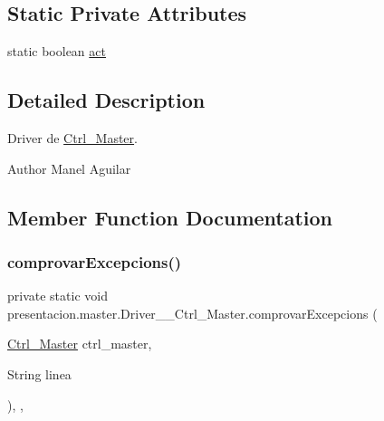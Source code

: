 \subsection*{Static Private Attributes}
\begin{DoxyCompactItemize}
\item 
static boolean \hyperlink{classpresentacion_1_1master_1_1Driver____Ctrl__Master_a76b217371c1036ed3e4e46d2c8d427c4}{act}
\end{DoxyCompactItemize}


\subsection{Detailed Description}
Driver de \hyperlink{classpresentacion_1_1master_1_1Ctrl__Master}{Ctrl\+\_\+\+Master}. 

\begin{DoxyAuthor}{Author}
Manel Aguilar 
\end{DoxyAuthor}


\subsection{Member Function Documentation}
\mbox{\label{classpresentacion_1_1master_1_1Driver____Ctrl__Master_ae522ded3194d6be2aa68cc60b7590716}} 
\subsubsection{\texorpdfstring{comprovar\+Excepcions()}{comprovarExcepcions()}}
{\footnotesize\ttfamily private static void presentacion.\+master.\+Driver\+\_\+\+\_\+\+Ctrl\+\_\+\+Master.\+comprovar\+Excepcions (\begin{DoxyParamCaption}\item[{\hyperlink{classpresentacion_1_1master_1_1Ctrl__Master}{Ctrl\+\_\+\+Master}}]{ctrl\+\_\+master,  }\item[{String}]{linea }\end{DoxyParamCaption})\hspace{0.3cm}{\ttfamily [inline]}, {\ttfamily [static]}, {\ttfamily [private]}}



